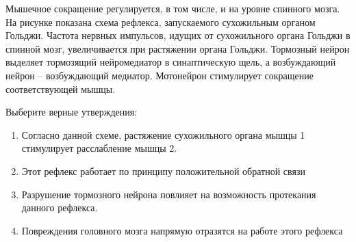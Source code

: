 
Мышечное
сокращение регулируется, в том числе, и на уровне спинного мозга. На рисунке
показана схема рефлекса, запускаемого сухожильным органом Гольджи. Частота
нервных импульсов, идущих от сухожильного органа Гольджи в спинной мозг,
увеличивается при растяжении органа Гольджи. Тормозный нейрон выделяет
тормозящий нейромедиатор в синаптическую щель, а возбуждающий нейрон –
возбуждающий медиатор. Мотонейрон стимулирует сокращение соответствующей мышцы.


Выберите
верные утверждения:

\begin{enumerate}
    \item Согласно данной схеме, растяжение сухожильного органа мышцы 1 стимулирует расслабление мышцы 2.
    \item Этот рефлекс работает по принципу положительной обратной связи 
    \item Разрушение тормозного нейрона повлияет на возможность протекания данного рефлекса.
    \item Повреждения головного мозга напрямую отразятся на работе этого рефлекса
\end{enumerate}

\explanationSection

